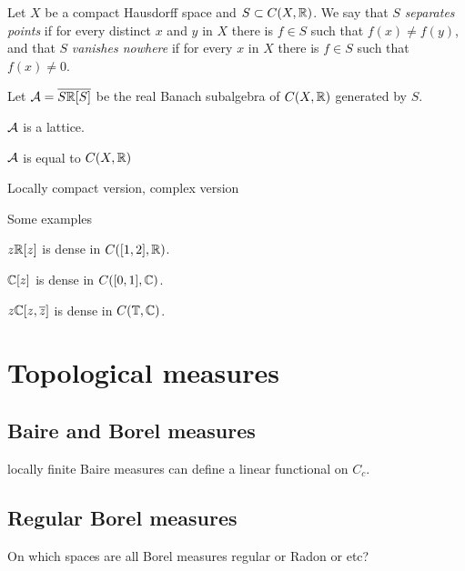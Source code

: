 \documentclass{../note}
\begin{document}
\begin{prb}
Let $X$ be a compact Hausdorff space and $S\subset C(X,\mathbb{R})$.
We say that $S$ \emph{separates points} if for every distinct $x$ and $y$ in $X$ there is $f\in S$ such that $f(x)\ne f(y)$, and that $S$ \emph{vanishes nowhere} if for every $x$ in $X$ there is $f\in S$ such that $f(x)\ne0$.

Let $\mathcal{A}=\overline{S\mathbb{R}[S]}$ be the real Banach subalgebra of $C(X,\mathbb{R})$ generated by $S$.
\begin{parts}
\item $\mathcal{A}$ is a lattice.
\item $\mathcal{A}$ is equal to $C(X,\mathbb{R})$
\end{parts}
\end{prb}




Locally compact version,
complex version








\begin{prb}
Some examples
\begin{parts}
\item $z\mathbb{R}[z]$ is dense in $C([1,2],\mathbb{R})$.
\item $\mathbb{C}[z]$ is dense in $C([0,1],\mathbb{C})$.
\item $z\mathbb{C}[z,\overline z]$ is dense in $C(\mathbb{T},\mathbb{C})$.
\end{parts}
\end{prb}












\chapter{Topological measures}
\section{Baire and Borel measures}
locally finite Baire measures can define a linear functional on $C_c$.



\section{Regular Borel measures}

On which spaces are all Borel measures regular or Radon or etc?
\end{document}
